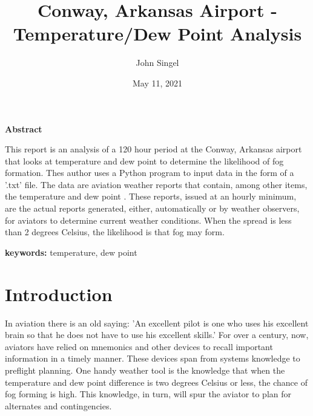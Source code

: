 \documentclass{article}
\begin{document}
\begin{center}
\LARGE
\textbf{Abstract}
\end{center}

\normalsize
This report is an analysis of a 120 hour period at the Conway, Arkansas airport that looks at temperature and dew point to determine the likelihood of fog formation. Thes author uses a Python program to input data in the form of a '.txt' file. The data are aviation weather reports that contain, among other items, the temperature and dew point . These reports, issued at an hourly minimum, are the actual reports generated, either, automatically or by weather observers, for aviators to determine current weather conditions. When the spread is less than 2 degrees Celsius, the likelihood is that fog may form.

\bigskip
\begin{flushleft}
\textbf{keywords:} temperature, dew point
\end{flushleft}

\newpage


\title{Conway, Arkansas Airport - Temperature/Dew Point Analysis}
\author{John Singel}\date{May 11, 2021}

\maketitle

\section{Introduction}
In aviation there is an old saying: 'An excellent pilot is one who uses his excellent brain so that he does not have to use his excellent skills.' For over a century, now, aviators have relied on mnemonics and other devices to recall important information in a timely manner. These devices span from systems knowledge to preflight planning. One handy weather tool is the knowledge that when the temperature and dew point difference is two degrees Celsius or less, the chance of fog forming is high. This knowledge, in turn, will spur the aviator to plan for alternates and contingencies.
\end{document}
